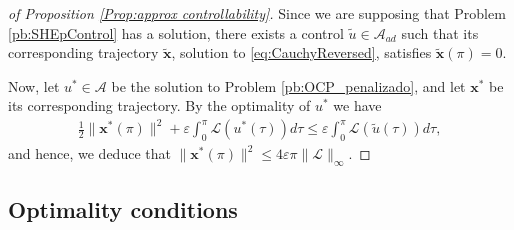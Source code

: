 \documentclass[twocolumn]{autart}    %
\begin{document}
\medskip 
\begin{proof}[of Proposition \ref{Prop:approx controllability}]
	Since we are supposing that Problem \ref{pb:SHEpControl} has a solution, there exists a control $\tilde{u}\in \mathcal{A}_{ad}$ such that its corresponding trajectory $\tilde{\bm{x}}$, solution to \eqref{eq:CauchyReversed}, satisfies $\tilde{\bm{x}}(\pi) = 0$. 
	
	Now, let $u^\ast\in \mathcal{A}$ be the solution to Problem \ref{pb:OCP_penalizado}, and let $\bm{x}^\ast$ be its corresponding trajectory. By the optimality of $u^\ast$ we have
	\begin{align*}
		\frac{1}{2} \| \bm{x}^\ast(\pi)\|^2 +\varepsilon \int_0^\pi \mathcal{L}(u^\ast(\tau))d\tau \leq \varepsilon \int_0^\pi \mathcal{L}(\tilde{u}(\tau))d\tau,
	\end{align*}
	and hence, we deduce that $\| \bm{x}^\ast (\pi)\|^2 \leq 4 \varepsilon \pi \| \mathcal{L}\|_\infty.$
\end{proof}

\subsection{Optimality conditions}\label{sec:opti cond}
\end{document}

